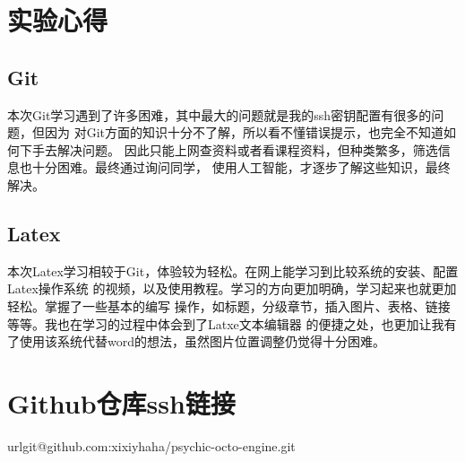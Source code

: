 \documentclass{ctexart}
\begin{document}
\section{实验心得}
    \subsection{Git}
    本次Git学习遇到了许多困难，其中最大的问题就是我的ssh密钥配置有很多的问题，但因为
    对Git方面的知识十分不了解，所以看不懂错误提示，也完全不知道如何下手去解决问题。
    因此只能上网查资料或者看课程资料，但种类繁多，筛选信息也十分困难。最终通过询问同学，
    使用人工智能，才逐步了解这些知识，最终解决。
    \subsection{Latex}
    本次Latex学习相较于Git，体验较为轻松。在网上能学习到比较系统的安装、配置Latex操作系统
    的视频，以及使用教程。学习的方向更加明确，学习起来也就更加轻松。掌握了一些基本的编写
    操作，如标题，分级章节，插入图片、表格、链接等等。我也在学习的过程中体会到了Latxe文本编辑器
    的便捷之处，也更加让我有了使用该系统代替word的想法，虽然图片位置调整仍觉得十分困难。
    
\section{Github仓库ssh链接}
 url{git@github.com:xixiyhaha/psychic-octo-engine.git}
\end{document}
